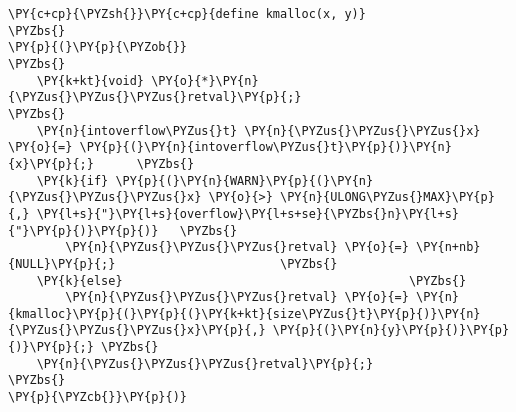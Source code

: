 \begin{Verbatim}[commandchars=\\\{\}]
\PY{c+cp}{\PYZsh{}}\PY{c+cp}{define kmalloc(x, y)}                           \PYZbs{}
\PY{p}{(}\PY{p}{\PYZob{}}                                              \PYZbs{}
    \PY{k+kt}{void} \PY{o}{*}\PY{n}{\PYZus{}\PYZus{}\PYZus{}retval}\PY{p}{;}                            \PYZbs{}
    \PY{n}{intoverflow\PYZus{}t} \PY{n}{\PYZus{}\PYZus{}\PYZus{}x} \PY{o}{=} \PY{p}{(}\PY{n}{intoverflow\PYZus{}t}\PY{p}{)}\PY{n}{x}\PY{p}{;}      \PYZbs{}
    \PY{k}{if} \PY{p}{(}\PY{n}{WARN}\PY{p}{(}\PY{n}{\PYZus{}\PYZus{}\PYZus{}x} \PY{o}{>} \PY{n}{ULONG\PYZus{}MAX}\PY{p}{,} \PY{l+s}{"}\PY{l+s}{overflow}\PY{l+s+se}{\PYZbs{}n}\PY{l+s}{"}\PY{p}{)}\PY{p}{)}   \PYZbs{}
        \PY{n}{\PYZus{}\PYZus{}\PYZus{}retval} \PY{o}{=} \PY{n+nb}{NULL}\PY{p}{;}                       \PYZbs{}
    \PY{k}{else}                                        \PYZbs{}
        \PY{n}{\PYZus{}\PYZus{}\PYZus{}retval} \PY{o}{=} \PY{n}{kmalloc}\PY{p}{(}\PY{p}{(}\PY{k+kt}{size\PYZus{}t}\PY{p}{)}\PY{n}{\PYZus{}\PYZus{}\PYZus{}x}\PY{p}{,} \PY{p}{(}\PY{n}{y}\PY{p}{)}\PY{p}{)}\PY{p}{;} \PYZbs{}
    \PY{n}{\PYZus{}\PYZus{}\PYZus{}retval}\PY{p}{;}                                  \PYZbs{}
\PY{p}{\PYZcb{}}\PY{p}{)}
\end{Verbatim}
